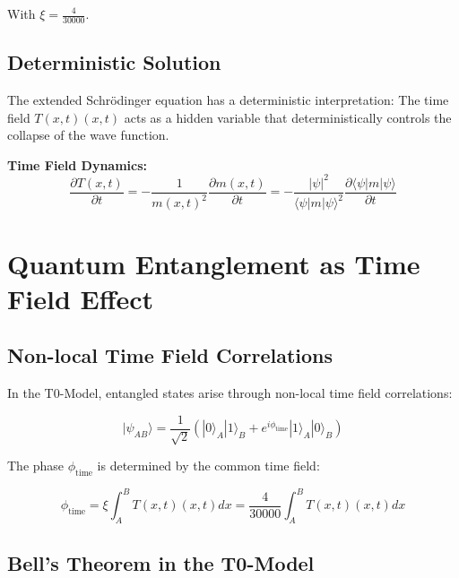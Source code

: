 \documentclass[12pt,a4paper]{report}
\newcommand{\Tfield}{T(x,t)}  %
\newcommand{\mfield}{m(x,t)}  %
\newcommand{\xipar}{\xi}      %
\begin{document}
	With $\xipar = \frac{4}{30000}$.
	
	\subsection{Deterministic Solution}\label{subsec:deterministic_solution}
	
	The extended Schrödinger equation has a deterministic interpretation: The time field $\Tfield(x,t)$ acts as a hidden variable that deterministically controls the collapse of the wave function.
	
	\textbf{Time Field Dynamics:}
	\begin{equation}\label{eq:timefield_dynamics}
		\frac{\partial \Tfield}{\partial t} = -\frac{1}{\mfield^2} \frac{\partial \mfield}{\partial t} = -\frac{|\psi|^2}{\langle \psi | m | \psi \rangle^2} \frac{\partial \langle \psi | m | \psi \rangle}{\partial t}
	\end{equation}
	
	\section{Quantum Entanglement as Time Field Effect}\label{sec:quantum_entanglement}
	
	\subsection{Non-local Time Field Correlations}\label{subsec:nonlocal_correlations}
	
	In the T0-Model, entangled states arise through non-local time field correlations:
	
	\begin{equation}\label{eq:entangled_state}
		|\psi_{AB}\rangle = \frac{1}{\sqrt{2}} \left(|0\rangle_A |1\rangle_B + e^{i\phi_{\text{time}}} |1\rangle_A |0\rangle_B\right)
	\end{equation}
	
	The phase $\phi_{\text{time}}$ is determined by the common time field:
	
	\begin{equation}\label{eq:timefield_phase}
		\phi_{\text{time}} = \xipar \int_A^B \Tfield(x,t) dx = \frac{4}{30000} \int_A^B \Tfield(x,t) dx
	\end{equation}
	
	\subsection{Bell's Theorem in the T0-Model}\label{subsec:bell_theorem_t0}
	
\end{document}
